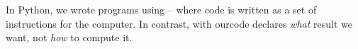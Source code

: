 In Python, we wrote programs using  -- where
code is written as a set of instructions for the computer.  In contrast, with
 ourcode declares \emph{what} result we want,
not \emph{how} to compute it. \\
